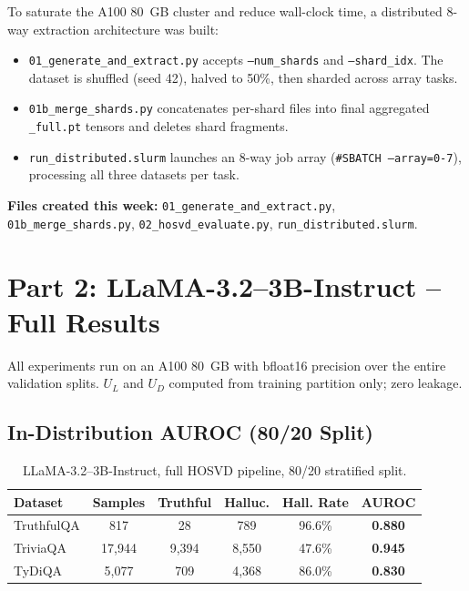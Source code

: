 \documentclass[11pt,a4paper]{article}
\begin{document}
To saturate the A100 80~GB cluster and reduce wall-clock time, a distributed
8-way extraction architecture was built:

\begin{itemize}
  \item \texttt{01\_generate\_and\_extract.py} accepts \texttt{--num\_shards}
        and \texttt{--shard\_idx}.  The dataset is shuffled (seed 42), halved
        to 50\%, then sharded across array tasks.
  \item \texttt{01b\_merge\_shards.py} concatenates per-shard files into
        final aggregated \texttt{\_full.pt} tensors and deletes shard fragments.
  \item \texttt{run\_distributed.slurm} launches an 8-way job array
        (\texttt{\#SBATCH --array=0-7}), processing all three datasets
        per task.
\end{itemize}

\noindent
\textbf{Files created this week:}
\texttt{01\_generate\_and\_extract.py},
\texttt{01b\_merge\_shards.py},
\texttt{02\_hosvd\_evaluate.py},
\texttt{run\_distributed.slurm}.

\section{Part 2: LLaMA-3.2--3B-Instruct -- Full Results}

All experiments run on an A100 80~GB with bfloat16 precision over the
entire validation splits.  $U_L$ and $U_D$ computed from training partition
only; zero leakage.

\subsection{In-Distribution AUROC (80/20 Split)}

\begin{table}[h]
\centering
\begin{tabular}{lccccc}
\toprule
\textbf{Dataset} & \textbf{Samples} & \textbf{Truthful} & \textbf{Halluc.} & \textbf{Hall. Rate} & \textbf{AUROC} \\
\midrule
TruthfulQA  & 817    & 28    & 789   & 96.6\% & \textbf{0.880} \\
TriviaQA    & 17,944 & 9,394 & 8,550 & 47.6\% & \textbf{0.945} \\
TyDiQA      & 5,077 & 709   & 4,368 & 86.0\% & \textbf{0.830} \\
\bottomrule
\end{tabular}
\caption{LLaMA-3.2--3B-Instruct, full HOSVD pipeline, 80/20 stratified split.}
\end{table}
\end{document}

